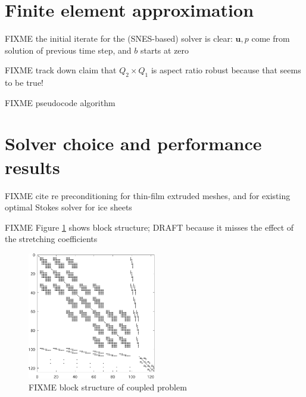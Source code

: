 \documentclass[letterpaper,final,12pt,reqno]{amsart}
\newcommand{\bu}{\mathbf{u}}
\begin{document}


\section{Finite element approximation}  \label{sec:finiteelement}

FIXME the initial iterate for the (SNES-based) solver is clear: $\bu,p$ come from solution of previous time step, and $b$ starts at zero

FIXME track down \cite{IsaacStadlerGhattas2015} claim that $Q_2\times Q_1$ is aspect ratio robust because that seems to be true!

FIXME pseudocode algorithm


\section{Solver choice and performance results} \label{sec:results}

FIXME cite \cite{Tuminaroetal2016} re preconditioning for thin-film extruded meshes, and \cite{IsaacStadlerGhattas2015} for existing optimal Stokes solver for ice sheets

FIXME Figure \ref{fig:blockstructure} shows block structure; DRAFT because it misses the effect of the stretching coefficients

\begin{figure}[ht]
\begin{center}
\includegraphics[width=0.5\textwidth]{figs/coarsespy.pdf}
\end{center}
\caption{FIXME block structure of coupled problem}
\label{fig:blockstructure}
\end{figure}
\end{document}
